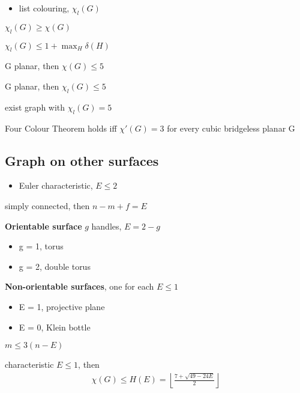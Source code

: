 \begin{itemize}
    \item list colouring, $\chi_l(G)$
\end{itemize}

\begin{fact}
    $\chi_l(G) \geq \chi(G)$
\end{fact}

\begin{fact}
    $\chi_l(G) \leq 1 + \max_H\delta(H)$
\end{fact}

\begin{thm}
    G planar, then $\chi(G) \leq 5$
\end{thm}

\begin{thm}[Thomasson]
    G planar, then $\chi_l(G) \leq 5$
\end{thm}

\begin{fact}
    exist graph with $\chi_l(G) = 5$
\end{fact}

\begin{thm}[Tait]
    Four Colour Theorem holds iff $\chi'(G) = 3$ for every cubic bridgeless planar G
\end{thm}

\subsection{Graph on other surfaces}\label{subsec:graph-on-other-surfaces}

\begin{itemize}
    \item Euler characteristic, $E \leq 2$
\end{itemize}

\begin{fact}
    simply connected, then $n - m + f = E$
\end{fact}

\begin{example}
    \textbf{Orientable surface} $g$ handles, $E = 2 - g$
    \begin{itemize}
        \item g = 1, torus
        \item g = 2, double torus
    \end{itemize}
    \textbf{Non-orientable surfaces}, one for each $E \leq 1$
    \begin{itemize}
        \item E = 1, projective plane
        \item E = 0, Klein bottle
    \end{itemize}
\end{example}

\begin{fact}
    $m \leq 3(n - E)$
\end{fact}

\begin{thm}[Heawood]
characteristic $E \leq 1$, then
    \begin{align*}
        \chi(G) \leq H(E) = \left \lfloor \frac{7 + \sqrt{49 - 24E}}{2} \right \rfloor
    \end{align*}
\end{thm}